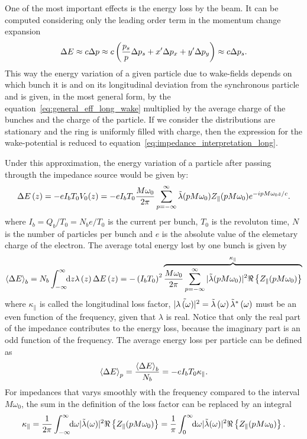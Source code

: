     One of the most important effects is the energy loss by the beam. It can be computed considering only the leading order term in the momentum change expansion
    \begin{align}
        \Delta E \approx c\Delta p \approx c\fof{\frac{p_s}{p}\Delta p_s + x'\Delta p_x + y'\Delta p_y} \approx c\Delta p_s.
    \end{align}
    This way the energy variation of a given particle due to wake-fields depends on which bunch it is and on its longitudinal deviation from the synchronous particle and is given, in the most general form, by the  equation~\eqref{eq:general_eff_long_wake} multiplied by the average charge of the bunches and the charge of the particle. If we consider the distributions are stationary and the ring is uniformly filled with charge, then the expression for the wake-potential is reduced to equation~\eqref{eq:impedance_interpretation_long}.

    Under this approximation, the energy variation of a particle after passing througth the impedance source would be given by:
    \begin{align}\label{eq:part_energy_loss}
	  	\Delta E\fof{z} = -eI_bT_0V_0(z) = -eI_bT_0\frac{M\omega_0}{2\pi} \sum_{p=-\infty}^\infty \fourier{\lambda}(pM\omega_0)Z_\parallel(pM\omega_0)e^{-ipM\omega_0 z/c}.
    \end{align}
    where $I_b=Q_b/T_0=N_be/T_0$ is the current per bunch, $T_0$ is the revoluton time, $N$ is the number of particles per bunch and $e$ is the absolute value of the elemetary charge of the electron. The average total energy lost by one bunch is given by
    \begin{align}\label{eq:energy_loss_bunch}
        \average[b]{\Delta E} = N_b\infint{z}{\lambda\fof{z}\Delta E\fof{z}} = -\fof{I_bT_0}^2\overbrace{\frac{M\omega_0}{2\pi} \sum_{p=-\infty}^\infty |\fourier{\lambda}(pM\omega_0)|^2\real{Z_\parallel(pM\omega_0)}}^{\kappa_\parallel}
    \end{align}
    where $\kappa_\parallel$ is called the longitudinal loss factor, $|\fourier{\lambda\fof{\omega}}|^2 = \fourier{\lambda}\fof{\omega}\fourier{\lambda}^*\fof{\omega}$ must be an even function of the frequency, given that $\lambda$ is real. Notice that only the real part of the impedance contributes to the energy loss, because the imaginary part is an odd function of the frequency. The average energy loss per particle can be defined as
    \begin{align}
        \average[p]{\Delta E} = \frac{\average[b]{\Delta E}}{N_b} = -eI_bT_0\kappa_\parallel.
    \end{align}
    For impedances that varys smoothly with the frequency compared to the interval $M\omega_0$, the sum in the definition of the loss factor can be replaced by an integral
    \begin{align}
        \kappa_\parallel =
            \frac{1}{2\pi} \infint{\omega}|\fourier{\lambda}(\omega)|^2\real{Z_\parallel(pM\omega_0)} =
            \frac1\pi \defint{\omega}{|\fourier{\lambda}(\omega)|^2\real{Z_\parallel(pM\omega_0)}}{0}{\infty}.
    \end{align}

